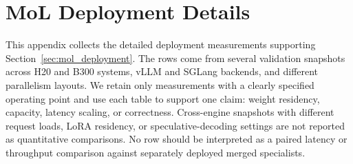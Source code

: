 \section{MoL Deployment Details}
\label{app:mol_deployment}

This appendix collects the detailed deployment measurements supporting
Section~\ref{sec:mol_deployment}. The rows come from several validation
snapshots across H20 and B300 systems, vLLM and SGLang backends, and different
parallelism layouts. We retain only measurements with a clearly specified
operating point and use each table to support one claim: weight residency,
capacity, latency scaling, or correctness. Cross-engine snapshots with
different request loads, LoRA residency, or speculative-decoding settings are
not reported as quantitative comparisons. No row should be interpreted as a
paired latency or throughput comparison against separately deployed merged
specialists.


